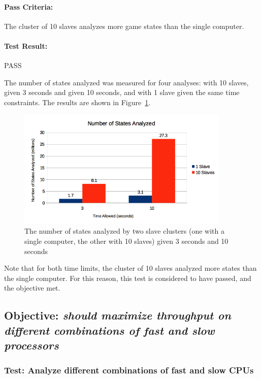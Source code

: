 \documentclass[pdftex,12pt,a4paper]{article}
\begin{document}
\paragraph{Pass Criteria:} The cluster of 10 slaves analyzes more game states than the single computer.

\paragraph{Test Result:} PASS

The number of states analyzed was measured for four analyses: with 10 slaves, given 3 seconds and given 10 seconds, and with 1 slave given the same time constraints. The results are shown in Figure~\ref{fig:number-analyzed}.

\begin{figure}[h]
\begin{center}
\includegraphics[width=0.9\textwidth]{img/number-analyzed}
\caption{The number of states analyzed by two slave clusters (one with a single computer, the other with 10 slaves) given 3 seconds and 10 seconds}
\label{fig:number-analyzed}
\end{center}
\end{figure}

Note that for both time limits, the cluster of 10 slaves analyzed more states than the single computer. For this reason, this test is considered to have passed, and the objective met. 

\subsection{\textbf{Objective:} \emph{should maximize throughput on different combinations of fast and slow processors}}

\subsubsection{\textbf{Test:} Analyze different combinations of fast and slow CPUs}
\end{document}
